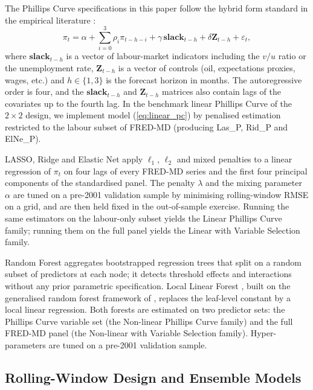 \documentclass[12pt,a4paper]{article}
\begin{document}
The Phillips Curve specifications in this paper follow the hybrid form standard in the empirical literature \citep{galigertler1999,benigno2023}:
\begin{equation}
\pi_t = \alpha + \sum_{i=0}^{3} \rho_{i} \pi_{t-h-i} + \gamma \, \mathbf{slack}_{t-h} + \delta \mathbf{Z}_{t-h} + \varepsilon_t,
\label{eq:linear_pc}
\end{equation}
where $\mathbf{slack}_{t-h}$ is a vector of labour-market indicators including the $v/u$ ratio or the unemployment rate, $\mathbf{Z}_{t-h}$ is a vector of controls (oil, expectations proxies, wages, etc.) and $h \in \{1, 3\}$ is the forecast horizon in months. The autoregressive order is four, and the $\mathbf{slack}_{t-h}$ and $\mathbf{Z}_{t-h}$ matrices also contain lags of the covariates up to the fourth lag. In the benchmark linear Phillips Curve of the $2 \times 2$ design, we implement model (\ref{eq:linear_pc}) by penalised estimation restricted to the labour subset of FRED-MD (producing Las\_P, Rid\_P and ElNe\_P).

LASSO, Ridge and Elastic Net \citep{tibshirani1996,zouhastie2005} apply $\ell_1$, $\ell_2$ and mixed penalties to a linear regression of $\pi_t$ on four lags of every FRED-MD series and the first four principal components of the standardised panel. The penalty $\lambda$ and the mixing parameter $\alpha$ are tuned on a pre-2001 validation sample by minimising rolling-window RMSE on a grid, and are then held fixed in the out-of-sample exercise. Running the same estimators on the labour-only subset yields the Linear Phillips Curve family; running them on the full panel yields the Linear with Variable Selection family.

Random Forest \citep{breiman2001} aggregates bootstrapped regression trees that split on a random subset of predictors at each node; it detects threshold effects and interactions without any prior parametric specification. Local Linear Forest \citep{friedberg2021}, built on the generalised random forest framework of \citet{athey2019grf}, replaces the leaf-level constant by a local linear regression. Both forests are estimated on two predictor sets: the Phillips Curve variable set (the Non-linear Phillips Curve family) and the full FRED-MD panel (the Non-linear with Variable Selection family). Hyper-parameters are tuned on a pre-2001 validation sample.

\subsection{Rolling-Window Design and Ensemble Models}
\label{subsec:rolling}
\end{document}
